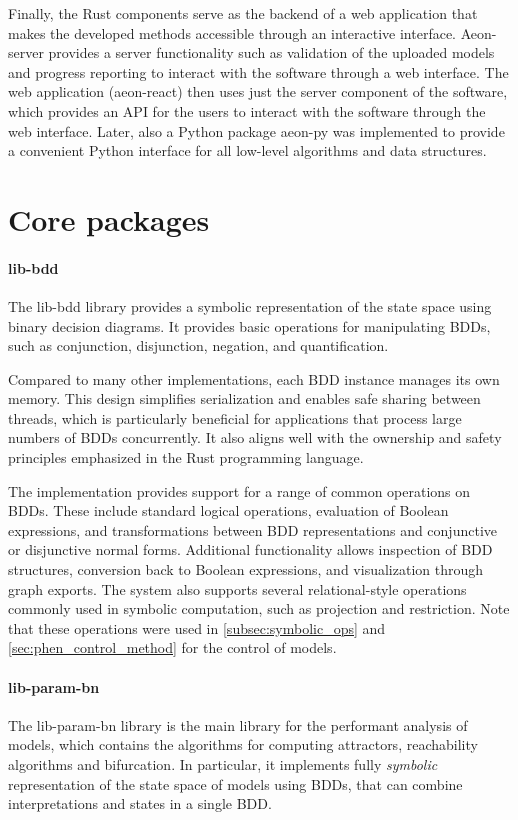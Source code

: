 Finally, the Rust components serve as the backend of a web application that makes the developed methods accessible through an interactive interface. Aeon-server provides a server functionality such as validation of the uploaded models and progress reporting to interact with the software through a web interface. The web application (aeon-react) then uses just the server component of the software, which provides an API for the users to interact with the software through the web interface. Later, also a Python package aeon-py was implemented to provide a convenient Python interface for all low-level algorithms and data structures. 

\section{Core packages}
\label{sec:core_packages}

\paragraph{lib-bdd} The lib-bdd library provides a symbolic representation of the state space using binary decision diagrams. It provides basic operations for manipulating BDDs, such as conjunction, disjunction, negation, and quantification. 

Compared to many other implementations, each BDD instance manages its own memory. This design simplifies serialization and enables safe sharing between threads, which is particularly beneficial for applications that process large numbers of BDDs concurrently. It also aligns well with the ownership and safety principles emphasized in the Rust programming language.

The implementation provides support for a range of common operations on BDDs. These include standard logical operations, evaluation of Boolean expressions, and transformations between BDD representations and conjunctive or disjunctive normal forms. Additional functionality allows inspection of BDD structures, conversion back to Boolean expressions, and visualization through graph exports. The system also supports several relational-style operations commonly used in symbolic computation, such as projection and restriction. Note that these operations were used in \autoref{subsec:symbolic_ops} and \autoref{sec:phen_control_method} for the control of \PBN{} models.

\paragraph{lib-param-bn} The lib-param-bn library is the main library for the performant analysis of \PBN{} models, which contains the algorithms for computing attractors, reachability algorithms and bifurcation. In particular, it implements fully \emph{symbolic} representation of the state space of \PBN{} models using BDDs, that can combine interpretations and states in a single BDD. 

